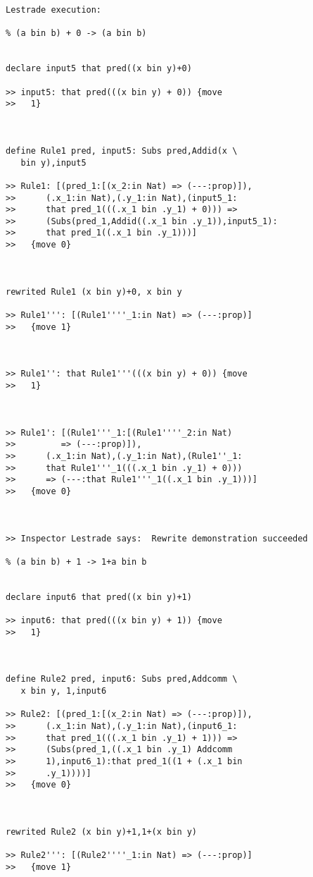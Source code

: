 \documentclass{article}
\begin{document}
\begin{verbatim}Lestrade execution:

% (a bin b) + 0 -> (a bin b)


declare input5 that pred((x bin y)+0)

>> input5: that pred(((x bin y) + 0)) {move
>>   1}



define Rule1 pred, input5: Subs pred,Addid(x \
   bin y),input5

>> Rule1: [(pred_1:[(x_2:in Nat) => (---:prop)]),
>>      (.x_1:in Nat),(.y_1:in Nat),(input5_1:
>>      that pred_1(((.x_1 bin .y_1) + 0))) =>
>>      (Subs(pred_1,Addid((.x_1 bin .y_1)),input5_1):
>>      that pred_1((.x_1 bin .y_1)))]
>>   {move 0}



rewrited Rule1 (x bin y)+0, x bin y

>> Rule1''': [(Rule1''''_1:in Nat) => (---:prop)]
>>   {move 1}



>> Rule1'': that Rule1'''(((x bin y) + 0)) {move
>>   1}



>> Rule1': [(Rule1'''_1:[(Rule1''''_2:in Nat)
>>         => (---:prop)]),
>>      (.x_1:in Nat),(.y_1:in Nat),(Rule1''_1:
>>      that Rule1'''_1(((.x_1 bin .y_1) + 0)))
>>      => (---:that Rule1'''_1((.x_1 bin .y_1)))]
>>   {move 0}



>> Inspector Lestrade says:  Rewrite demonstration succeeded

% (a bin b) + 1 -> 1+a bin b


declare input6 that pred((x bin y)+1)

>> input6: that pred(((x bin y) + 1)) {move
>>   1}



define Rule2 pred, input6: Subs pred,Addcomm \
   x bin y, 1,input6

>> Rule2: [(pred_1:[(x_2:in Nat) => (---:prop)]),
>>      (.x_1:in Nat),(.y_1:in Nat),(input6_1:
>>      that pred_1(((.x_1 bin .y_1) + 1))) =>
>>      (Subs(pred_1,((.x_1 bin .y_1) Addcomm
>>      1),input6_1):that pred_1((1 + (.x_1 bin
>>      .y_1))))]
>>   {move 0}



rewrited Rule2 (x bin y)+1,1+(x bin y)

>> Rule2''': [(Rule2''''_1:in Nat) => (---:prop)]
>>   {move 1}




\end{verbatim}
\end{document}

